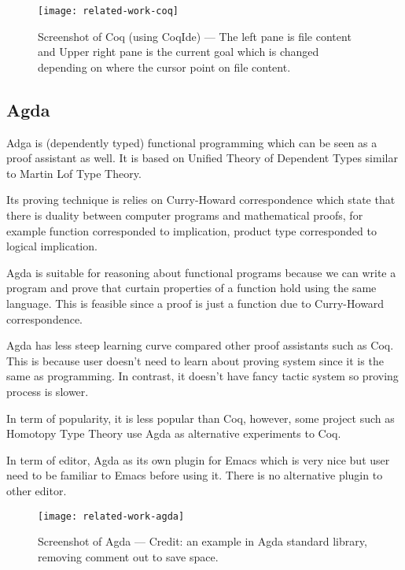 \documentclass[master.tex]{subfiles}
\begin{document}
\begin{figure}[H]
    \centering
    \texttt{[image: related-work-coq]}
    \caption{Screenshot of Coq (using CoqIde) --- The left pane is file content
      and Upper right pane is the current goal which is changed depending on
      where the cursor point on file content.}
\label{fig:background-coq}
\end{figure}

\subsection{Agda}
Adga\supercite{agda-official-website} is (dependently typed) functional
programming which can be seen as a proof assistant as well. It is based on
Unified Theory of Dependent
Types\supercite{norell:thesis}\supercite{Luo:1994:CRT:184757} similar to Martin
Lof Type Theory.

Its proving technique is relies on Curry-Howard correspondence
which state that there is duality between computer programs and mathematical
proofs\supercite{curry-howard-correspondence}, for example function corresponded
to implication, product type corresponded to logical implication.

Agda is suitable for reasoning about functional programs because we can write a
program and prove that curtain properties of a function hold using the same
language. This is feasible since a proof is just a function due to Curry-Howard
correspondence.

Agda has less steep learning curve compared other proof assistants such as Coq.
This is because user doesn't need to learn about proving
system since it is the same as programming. In contrast, it doesn't have
fancy tactic system so proving process is slower.

In term of popularity, it is less popular than Coq, however, some project such
as Homotopy Type Theory\supercite{hott-coq-repo}\supercite{hott-agda-repo} use
Agda as alternative experiments to Coq.

In term of editor, Agda as its own plugin for Emacs which is very nice but user
need to be familiar to Emacs before using it. There is no alternative plugin to
other editor.

\begin{figure}[H]
    \centering
    \texttt{[image: related-work-agda]}
    \caption{Screenshot of Agda --- Credit: an example in Agda standard library,
    removing comment out to save space.}
\label{fig:background-agda}
\end{figure}
\end{document}
